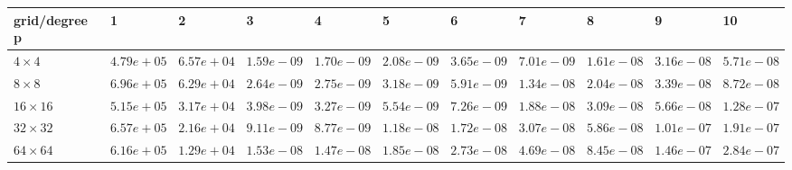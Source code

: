 \begin{tabular}{lllllllllll}
\hline
 grid/degree p   & 1          & 2          & 3          & 4          & 5          & 6          & 7          & 8          & 9          & 10         \\
\hline
 $4 \times 4$    & $4.79e+05$ & $6.57e+04$ & $1.59e-09$ & $1.70e-09$ & $2.08e-09$ & $3.65e-09$ & $7.01e-09$ & $1.61e-08$ & $3.16e-08$ & $5.71e-08$ \\
 $8 \times 8$    & $6.96e+05$ & $6.29e+04$ & $2.64e-09$ & $2.75e-09$ & $3.18e-09$ & $5.91e-09$ & $1.34e-08$ & $2.04e-08$ & $3.39e-08$ & $8.72e-08$ \\
 $16 \times 16$  & $5.15e+05$ & $3.17e+04$ & $3.98e-09$ & $3.27e-09$ & $5.54e-09$ & $7.26e-09$ & $1.88e-08$ & $3.09e-08$ & $5.66e-08$ & $1.28e-07$ \\
 $32 \times 32$  & $6.57e+05$ & $2.16e+04$ & $9.11e-09$ & $8.77e-09$ & $1.18e-08$ & $1.72e-08$ & $3.07e-08$ & $5.86e-08$ & $1.01e-07$ & $1.91e-07$ \\
 $64 \times 64$  & $6.16e+05$ & $1.29e+04$ & $1.53e-08$ & $1.47e-08$ & $1.85e-08$ & $2.73e-08$ & $4.69e-08$ & $8.45e-08$ & $1.46e-07$ & $2.84e-07$ \\
\hline
\end{tabular}